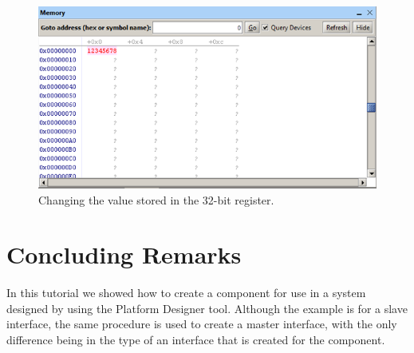 \documentclass[11pt, twoside, pdftex]{article}
\begin{document}
\clearpage

\begin{figure}[H]
   \begin{center}
        \includegraphics[scale=0.75]{figures/figure34.png}
   \end{center}
   \caption{Changing the value stored in the 32-bit register.}
	\label{fig:34}
\end{figure}

\section{Concluding Remarks}

In this tutorial we showed how to create a component for use in a system designed by using the 
Platform Designer tool.  Although the example is for a slave interface, the same procedure is used to 
create a master interface, with the only difference being in the type of an interface that is 
created for the component.

\clearpage
\newpage
\end{document}

